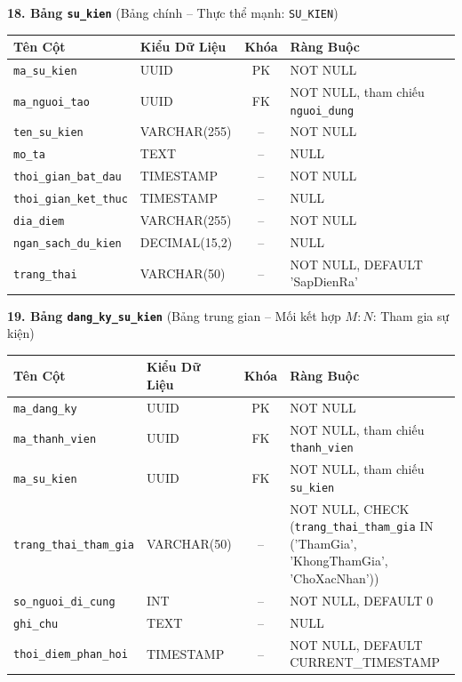\noindent\textbf{18. Bảng \texttt{su\_kien}} \quad (Bảng chính -- Thực thể mạnh: \texttt{SU\_KIEN})
\vspace{0.2cm}

\begin{center}
\small
\renewcommand{\arraystretch}{1.2}
\begin{tabular}{|p{3.8cm}|p{2.5cm}|c|p{6.5cm}|}
\hline
\textbf{Tên Cột} & \textbf{Kiểu Dữ Liệu} & \textbf{Khóa} & \textbf{Ràng Buộc} \\ \hline
\texttt{ma\_su\_kien} & UUID & PK & NOT NULL \\ \hline
\texttt{ma\_nguoi\_tao} & UUID & FK & NOT NULL, tham chiếu \texttt{nguoi\_dung} \\ \hline
\texttt{ten\_su\_kien} & VARCHAR(255) & -- & NOT NULL \\ \hline
\texttt{mo\_ta} & TEXT & -- & NULL \\ \hline
\texttt{thoi\_gian\_bat\_dau} & TIMESTAMP & -- & NOT NULL \\ \hline
\texttt{thoi\_gian\_ket\_thuc} & TIMESTAMP & -- & NULL \\ \hline
\texttt{dia\_diem} & VARCHAR(255) & -- & NOT NULL \\ \hline
\texttt{ngan\_sach\_du\_kien} & DECIMAL(15,2) & -- & NULL \\ \hline
\texttt{trang\_thai} & VARCHAR(50) & -- & NOT NULL, DEFAULT 'SapDienRa' \\ \hline
\end{tabular}
\end{center}
\vspace{0.3cm}

\noindent\textbf{19. Bảng \texttt{dang\_ky\_su\_kien}} \quad (Bảng trung gian -- Mối kết hợp $M{:}N$: Tham gia sự kiện)
\vspace{0.2cm}

\begin{center}
\small
\renewcommand{\arraystretch}{1.2}
\begin{tabular}{|p{3.8cm}|p{2.5cm}|c|p{6.5cm}|}
\hline
\textbf{Tên Cột} & \textbf{Kiểu Dữ Liệu} & \textbf{Khóa} & \textbf{Ràng Buộc} \\ \hline
\texttt{ma\_dang\_ky} & UUID & PK & NOT NULL \\ \hline
\texttt{ma\_thanh\_vien} & UUID & FK & NOT NULL, tham chiếu \texttt{thanh\_vien} \\ \hline
\texttt{ma\_su\_kien} & UUID & FK & NOT NULL, tham chiếu \texttt{su\_kien} \\ \hline
\texttt{trang\_thai\_tham\_gia} & VARCHAR(50) & -- & NOT NULL, CHECK (\texttt{trang\_thai\_tham\_gia} IN ('ThamGia', 'KhongThamGia', 'ChoXacNhan')) \\ \hline
\texttt{so\_nguoi\_di\_cung} & INT & -- & NOT NULL, DEFAULT 0 \\ \hline
\texttt{ghi\_chu} & TEXT & -- & NULL \\ \hline
\texttt{thoi\_diem\_phan\_hoi} & TIMESTAMP & -- & NOT NULL, DEFAULT CURRENT\_TIMESTAMP \\ \hline
\end{tabular}
\end{center}
\vspace{0.3cm}

